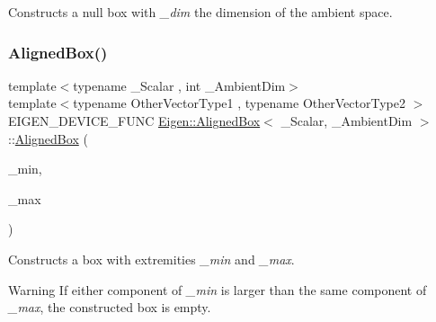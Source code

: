 Constructs a null box with {\itshape \+\_\+dim} the dimension of the ambient space. \mbox{\label{class_eigen_1_1_aligned_box_afbede45e6cc624de2033d219a158f248}} 
\subsubsection{\texorpdfstring{AlignedBox()}{AlignedBox()}\hspace{0.1cm}{\footnotesize\ttfamily [3/5]}}
{\footnotesize\ttfamily template$<$typename \+\_\+\+Scalar , int \+\_\+\+Ambient\+Dim$>$ \\
template$<$typename Other\+Vector\+Type1 , typename Other\+Vector\+Type2 $>$ \\
E\+I\+G\+E\+N\+\_\+\+D\+E\+V\+I\+C\+E\+\_\+\+F\+U\+NC \mbox{\hyperlink{class_eigen_1_1_aligned_box}{Eigen\+::\+Aligned\+Box}}$<$ \+\_\+\+Scalar, \+\_\+\+Ambient\+Dim $>$\+::\mbox{\hyperlink{class_eigen_1_1_aligned_box}{Aligned\+Box}} (\begin{DoxyParamCaption}\item[{const Other\+Vector\+Type1 \&}]{\+\_\+min,  }\item[{const Other\+Vector\+Type2 \&}]{\+\_\+max }\end{DoxyParamCaption})\hspace{0.3cm}{\ttfamily [inline]}}

Constructs a box with extremities {\itshape \+\_\+min} and {\itshape \+\_\+max}. \begin{DoxyWarning}{Warning}
If either component of {\itshape \+\_\+min} is larger than the same component of {\itshape \+\_\+max}, the constructed box is empty. 
\end{DoxyWarning}
\mbox{\label{class_eigen_1_1_aligned_box_a2d851323bca421a59fb73b1258d130e7}} 
